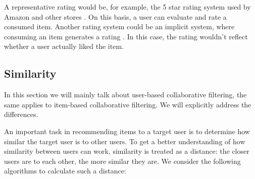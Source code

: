 A representative rating would be, for example, the 5 star rating system used by Amazon and other stores \cite{LU20121, miningOfMassiveDatasets}. On this basis, a user can evaluate and rate a consumed item. Another rating system could be an implicit system, where consuming an item generates a rating \cite{miningOfMassiveDatasets}. In this case, the rating wouldn't reflect whether a user actually liked the item.


\subsection{Similarity}

In this section we will mainly talk about user-based collaborative filtering, the same applies to item-based collaborative filtering. We will explicitly address the differences.

An important task in recommending items to a target user is to determine how similar the target user is to other users. To get a better understanding of how similarity between users can work, similarity is treated as a distance: the closer users are to each other, the more similar they are. We consider the following algorithms to calculate such a distance:

